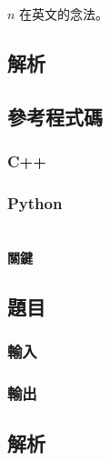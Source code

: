\documentclass[a4paper,10pt]{article}
\begin{document}
$n$ 在英文的念法。

\subsection{解析}

\subsection{參考程式碼}

\subsubsection{C++}



\subsubsection{Python}



\section{}

\paragraph{關鍵}

\subsection{題目}



\subsubsection{輸入}



\subsubsection{輸出}



\subsection{解析}
\end{document}
